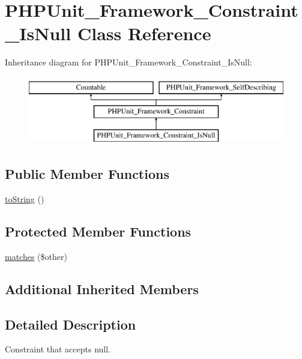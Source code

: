 \hypertarget{class_p_h_p_unit___framework___constraint___is_null}{}\section{P\+H\+P\+Unit\+\_\+\+Framework\+\_\+\+Constraint\+\_\+\+Is\+Null Class Reference}
\label{class_p_h_p_unit___framework___constraint___is_null}
Inheritance diagram for P\+H\+P\+Unit\+\_\+\+Framework\+\_\+\+Constraint\+\_\+\+Is\+Null\+:\begin{figure}[H]
\begin{center}
\leavevmode
\includegraphics[height=3.000000cm]{class_p_h_p_unit___framework___constraint___is_null}
\end{center}
\end{figure}
\subsection*{Public Member Functions}
\begin{DoxyCompactItemize}
\item 
\mbox{\hyperlink{class_p_h_p_unit___framework___constraint___is_null_a5558c5d549f41597377fa1ea8a1cefa3}{to\+String}} ()
\end{DoxyCompactItemize}
\subsection*{Protected Member Functions}
\begin{DoxyCompactItemize}
\item 
\mbox{\hyperlink{class_p_h_p_unit___framework___constraint___is_null_a9c9c337de483bbdbb9fa249a6c7c9cc5}{matches}} (\$other)
\end{DoxyCompactItemize}
\subsection*{Additional Inherited Members}


\subsection{Detailed Description}
Constraint that accepts null. 

